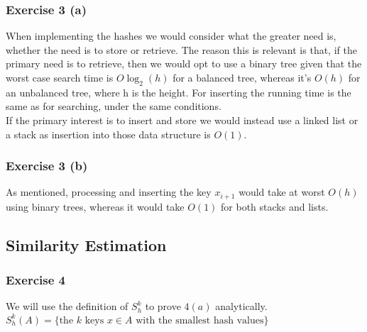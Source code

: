\subsubsection{Exercise 3 (a)}
When implementing the hashes we would consider what the greater need is, whether the need is to store or retrieve. The reason this is relevant is that, if the primary need is to retrieve, then we would opt to use a binary tree given that the worst case search time is \(O\log_2(h)\) for a balanced tree, whereas it's \(O(h)\) for an unbalanced tree, where h is the height. For inserting the running time is the same as for searching, under the same conditions.\\
If the primary interest is to insert and store we would instead use a linked list or a stack as insertion into those data structure is \(O(1)\).\\
\subsubsection{Exercise 3 (b)}
As mentioned, processing and inserting the key \(x_{i+1}\) would take at worst \(O(h)\) using binary trees, whereas it would take \(O(1)\) for both stacks and lists.
\subsection{Similarity Estimation}
\subsubsection{Exercise 4}
We will use the definition of \(S_h^k \) to prove \(4(a)\) analytically. \(S_h^k(A) = \{\text{the } k \text{ keys } x \in A \text{ with the smallest hash values}\} \)
